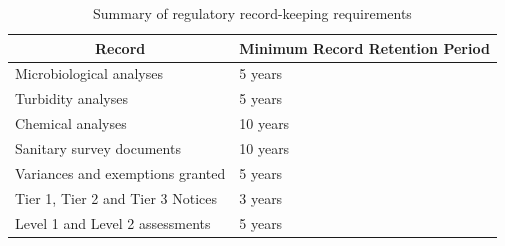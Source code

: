 \documentclass{article}
\begin{document}
\begin{table}[h!]
\begin{center}
\begin{tabular}{|l|l|}
\hline
\multicolumn{1}{|c|}{\textbf{Record}} & \multicolumn{1}{c|}{\textbf{Minimum Record   Retention Period}} \\ \hline
Microbiological   analyses            & 5 years                                                         \\ \hline
Turbidity   analyses                  & 5 years                                                         \\ \hline
Chemical   analyses                   & 10 years                                                        \\ \hline
Sanitary   survey documents           & 10 years                                                        \\ \hline
Variances and   exemptions granted    & 5 years                                                         \\ \hline
Tier 1, Tier 2   and Tier 3 Notices   & 3 years                                                         \\ \hline
Level 1 and   Level 2 assessments     & 5 years                                                         \\ \hline
\end{tabular}
\caption{Summary of regulatory record-keeping requirements}
\end{center}
\end{table}

\newpage
\end{document}
